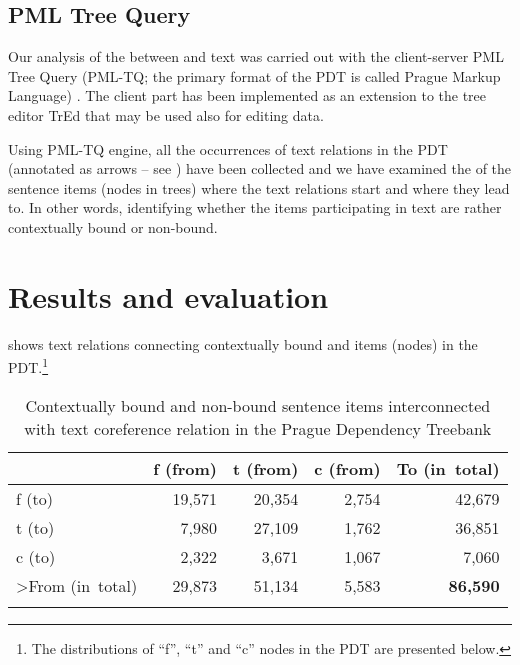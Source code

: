 \documentclass[output=paper]{langsci/langscibook.cls}
\begin{document}
\subsection{PML Tree Query\label{rysova_k:sec:PMLTreeQuery}}
                                                                                                                                                                          
Our analysis of the  between  and text  was carried out with the client-server PML Tree Query (PML-TQ; the primary format of the PDT is called Prague Markup Language) \citep{Stepanek2010}. The client part has been implemented as an extension to the tree editor TrEd \citep{Pajas2008} that may be used also for editing data. 

Using PML-TQ engine, all the occurrences of text  relations in the PDT (annotated as arrows -- see ) have been collected and we have examined the  of the sentence items (nodes in  trees) where the text  relations start and where they lead to. In other words, identifying whether the items participating in text  are rather contextually bound or non-bound.

\section{Results and evaluation\label{rysova_k:sec:ResultsAndEvaluation}}

 shows text  relations connecting contextually bound and  items (nodes) in the PDT.\footnote{The distributions of ``f'', ``t'' and ``c'' nodes in the PDT are presented below.}

\begin{table}
\caption{Contextually bound and non-bound sentence items interconnected with text coreference relation in the Prague Dependency Treebank}
\begin{tabularx}{\textwidth}{Xrrrr}
\lsptoprule
 &
f (from) &
t (from) &
c (from) &
To (in~total)\\  
\midrule
f (to) &
19,571 &
20,354 &
2,754 &
42,679\\ 
t (to) &
7,980 &
27,109 &
1,762 &
36,851\\ 
c (to) &
2,322 &
3,671 &
1,067 &
7,060\\ 
\midrule
>From (in~total) &
29,873 &
51,134 &
5,583 &
\textbf{86,590}\\
\lspbottomrule
\end{tabularx}
\label{rysova_k:tab:1}
\end{table}
\end{document}
